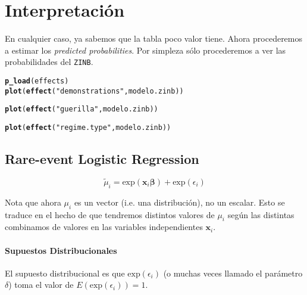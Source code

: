 \documentclass[onesided]{article}\usepackage[]{graphicx}\usepackage[]{color}
\makeatletter
\newcommand{\hlstr}[1]{\textcolor[rgb]{0.192,0.494,0.8}{#1}}%
\newcommand{\hlstd}[1]{\textcolor[rgb]{0.345,0.345,0.345}{#1}}%
\newcommand{\hlkwd}[1]{\textcolor[rgb]{0.737,0.353,0.396}{\textbf{#1}}}%
\newenvironment{kframe}{%
 \def\at@end@of@kframe{}%
 \ifinner\ifhmode%
  \def\at@end@of@kframe{\end{minipage}}%
  \begin{minipage}{\columnwidth}%
 \fi\fi%
 \def\FrameCommand##1{\hskip\@totalleftmargin \hskip-\fboxsep
 \colorbox{shadecolor}{##1}\hskip-\fboxsep
     \hskip-\linewidth \hskip-\@totalleftmargin \hskip\columnwidth}%
 \MakeFramed {\advance\hsize-\width
   \@totalleftmargin\z@ \linewidth\hsize
   \@setminipage}}%
 {\par\unskip\endMakeFramed%
 \at@end@of@kframe}
\makeatother
\begin{document}
\section{Interpretaci\'on} 

En cualquier caso, ya sabemos que la tabla poco valor tiene. Ahora procederemos a estimar los \emph{predicted probabilities}. Por simpleza s\'olo procederemos a ver las probabilidades del \texttt{ZINB}.


\begin{kframe}
\begin{alltt}
\hlkwd{p_load}\hlstd{(effects)}
\hlkwd{plot}\hlstd{(}\hlkwd{effect}\hlstd{(}\hlstr{"demonstrations"}\hlstd{, modelo.zinb))}
\end{alltt}


{\ttfamily\noindent\bfseries\color{errorcolor}{\#\# Error in mod.matrix \%*\% scoef: argumentos no compatibles}}\begin{alltt}
\hlkwd{plot}\hlstd{(}\hlkwd{effect}\hlstd{(}\hlstr{"guerilla"}\hlstd{, modelo.zinb))}
\end{alltt}


{\ttfamily\noindent\bfseries\color{errorcolor}{\#\# Error in mod.matrix \%*\% scoef: argumentos no compatibles}}\begin{alltt}
\hlkwd{plot}\hlstd{(}\hlkwd{effect}\hlstd{(}\hlstr{"regime.type"}\hlstd{, modelo.zinb))}
\end{alltt}


{\ttfamily\noindent\bfseries\color{errorcolor}{\#\# Error in factors[, term2]: sub'indice fuera de\ \ los l'imites}}\end{kframe}



\subsection{Rare-event Logistic Regression}



\begin{equation}\label{nb:mu}
\tilde{\mu}_{i} = \text{exp}(\boldsymbol{x}_{i}\boldsymbol{\beta}) + \text{exp}(\epsilon_{i})
\end{equation}

Nota que ahora $\mu_{i}$ es un vector (i.e. una distribuci\'on), no un escalar. Esto se traduce en el hecho de que tendremos distintos valores de $\mu_{i}$ seg\'un las distintas combinamos de valores en las variables independientes $\boldsymbol{x}_{i}$. 

\paragraph{Supuestos Distribucionales} El supuesto distribucional es que $\text{exp}(\epsilon_{i})$ (o muchas veces llamado el par\'ametro $\delta$)  toma el valor de $E(\text{exp}(\epsilon_{i}))=1$. 
\end{document}
